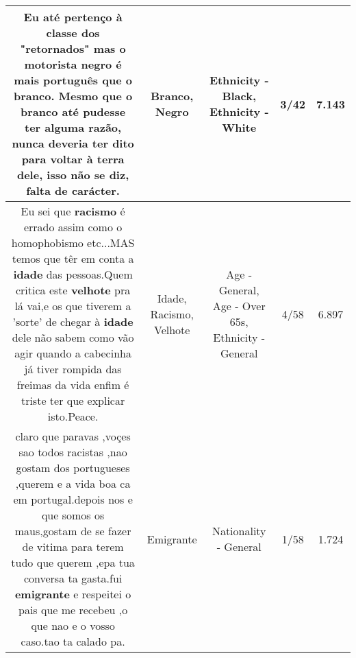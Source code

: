 \documentclass[11pt]{article}
\newlength\mylength
\begin{document}
\begin{center}
\begin{longtable}{|C{.65\mylength}|C{.30\mylength}|C{.12\mylength}|C{.12\mylength}|C{.12\mylength}|}
  \small Eu até pertenço à classe dos "retornados" mas o motorista \textbf{negro} é mais português que o \textbf{branco}. Mesmo que o \textbf{branco} até pudesse ter alguma razão, nunca deveria ter dito para voltar à terra dele, isso não se diz, falta de carácter.\normalsize   & Branco, Negro & Ethnicity - Black, Ethnicity - White & 3/42 & 7.143 \\  \hline
  \small Eu sei que \textbf{racismo} é errado assim como o homophobismo etc...MAS temos que têr em conta a \textbf{idade} das pessoas.Quem critica este \textbf{velhote} pra lá vai,e os que tiverem a 'sorte' de chegar à \textbf{idade} dele não sabem como vão agir quando a cabecinha já tiver rompida das freimas da vida enfim é triste ter que explicar isto.Peace.\normalsize   & Idade, Racismo, Velhote & Age - General, Age - Over 65s, Ethnicity - General & 4/58 & 6.897 \\  \hline
  \small claro que paravas ,voçes sao todos racistas ,nao gostam dos portugueses ,querem e a vida boa ca em portugal.depois nos e que somos os maus,gostam de se fazer de vitima para terem tudo que querem ,epa tua conversa ta gasta.fui \textbf{emigrante} e respeitei o pais que me recebeu ,o que nao e o vosso caso.tao ta calado pa.\normalsize   & Emigrante & Nationality - General & 1/58 & 1.724 \\  \hline
  
\end{longtable}
\end{center}
\end{document}
